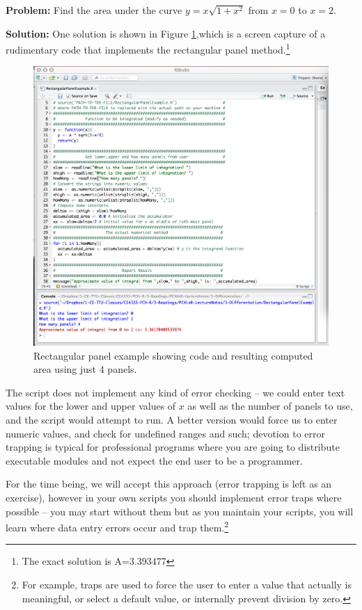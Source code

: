 \newpage \textbf{Problem:} Find the area under the curve $y= x\sqrt{1+x^2}$  from $x = 0$ to $x = 2$.

\textbf{Solution:} One solution is shown in Figure \ref{fig:RectExample},which is a screen capture of a rudimentary code that implements the rectangular panel method.\footnote{The exact solution is A=3.393477}   
\begin{figure}[h!] %
   \centering
   \includegraphics[width=6in]{./3-Differentation/RectExample.jpg} 
   \caption{Rectangular panel example showing code and resulting computed area using just 4 panels.}
   \label{fig:RectExample}
\end{figure}

The script does not implement any kind of error checking -- we could enter text values for the lower and upper values of $x$ as well as the number of panels to use, and the script would attempt to run. 
A better version would force us to enter numeric values, and check for undefined ranges and such; devotion to error trapping is typical for professional programs where you are going to distribute executable modules and not expect the end user to be a programmer.

For the time being, we will accept this approach (error trapping is left as an exercise), however in your own scripts you should implement error traps where possible -- you may start without them but as you maintain your scripts, you will learn where data entry errors occur and trap them.\footnote{For example, traps are used to force the user to enter a value that actually is meaningful, or select a default value, or internally prevent division by zero.}

